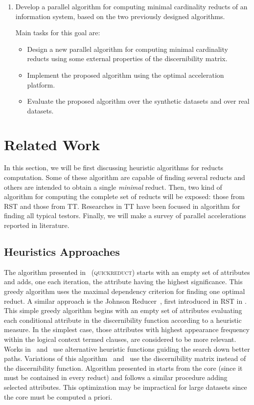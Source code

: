 \documentclass[11pt]{article}   %
\begin{document}
\begin{enumerate}
  \item Develop a parallel algorithm for computing minimal cardinality reducts of an information system, based 
  		on the two previously designed algorithms.
  		
  		Main tasks for this goal are:
  		\begin{itemize}
  		\item Design a new parallel algorithm for computing minimal cardinality reducts using some external
  		      properties of the discernibility matrix.
  		\item Implement the proposed algorithm using the optimal acceleration platform.
  		\item Evaluate the proposed algorithm over the synthetic datasets and over real datasets.
  		\end{itemize}
  \end{enumerate}

\section{Related Work}\label{relatedWork}
  In this section, we will be first discussing heuristic algorithms for reducts computation. Some of these 
  algorithm are capable of finding several reducts and others are intended to obtain a single \textit{minimal} 
  reduct. Then, two kind of algorithm for computing the complete set of reducts will be exposed: those 
  from RST and those from TT. Researches in TT have been focused in algorithm for finding all typical testors.
  Finally, we will make a survey of parallel accelerations reported in literature.  
  
\subsection{Heuristics Approaches}
  The algorithm presented in~\cite{Chouchoulas01} (\textsc{quickreduct}) starts with an empty set of 
  attributes and adds, one each iteration, the attribute having the highest significance. This greedy algorithm 
  uses the maximal dependency criterion for finding one optimal reduct.  
  A similar approach is the Johnson Reducer~\cite{Johnson74}, first introduced in RST in \cite{Ohrn00}.
  This simple greedy algorithm begins with an empty set of attributes evaluating each conditional attribute in the
  discernibility function according to a heuristic measure. In the simplest case, those attributes with highest 
  appearance frequency within the logical context termed clauses, are considered to be more relevant. Works 
  in~\cite{Nguyen97} and~\cite{Wang01} use alternative heuristic functions guiding the search down better paths. 
  Variations of this algorithm~\cite{Wang01} and~\cite{Yang08} use the discernibility matrix instead of the
  discernibility function.
  Algorithm presented in \cite{Zhong01} starts from the core (since it must be contained in every reduct) and
  follows a similar procedure adding selected attributes. This optimization may be impractical for large datasets
  \cite{Jensen14} since the core must be computed a priori.
  
\end{document}
